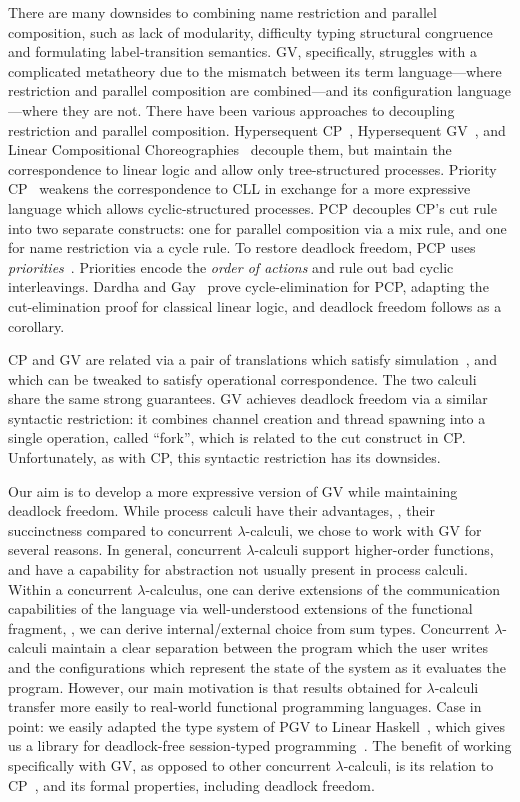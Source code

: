 There are many downsides to combining name restriction and parallel composition, such as lack of modularity, difficulty typing structural congruence and formulating label-transition semantics. GV, specifically, struggles with a complicated metatheory due to the mismatch between its term language---where restriction and parallel composition are combined---and its configuration language---where they are not. There have been various approaches to decoupling restriction and parallel composition. Hypersequent CP~\cite{MP18,kokkemontesi19popl,kokkemontesi19tlla}, Hypersequent GV~\cite{fowleretal21}, and Linear Compositional Choreographies~\cite{CarboneMS18} decouple them, but maintain the correspondence to linear logic and allow only tree-structured processes. Priority CP~\cite[PCP]{dardhagay18extended} weakens the correspondence to CLL in exchange for a more expressive language which allows cyclic-structured processes. PCP decouples CP's cut rule into two separate constructs: one for parallel composition via a mix rule, and one for name restriction via a cycle rule. To restore deadlock freedom, PCP uses \emph{priorities}~\cite{kobayashi06,padovani14}. Priorities encode the \emph{order of actions} and rule out bad cyclic interleavings. Dardha and Gay~\cite{dardhagay18extended} prove cycle-elimination for PCP, adapting the cut-elimination proof for classical linear logic, and deadlock freedom follows as a corollary.

CP and GV are related via a pair of translations which satisfy simulation~\cite{lindleymorris16}, and which can be tweaked to satisfy operational correspondence. The two calculi share the same strong guarantees. GV achieves deadlock freedom via a similar syntactic restriction: it combines channel creation and thread spawning into a single operation, called ``fork'', which is related to the cut construct in CP. Unfortunately, as with CP, this syntactic restriction has its downsides.

Our aim is to develop a more expressive version of GV while maintaining deadlock freedom. While process calculi have their advantages, \eg, their succinctness compared to concurrent $\lambda$-calculi, we chose to work with GV for several reasons. In general, concurrent $\lambda$-calculi support higher-order functions, and have a capability for abstraction not usually present in process calculi. Within a concurrent $\lambda$-calculus, one can derive extensions of the communication capabilities of the language via well-understood extensions of the functional fragment, \eg, we can derive internal/external choice from sum types. Concurrent $\lambda$-calculi maintain a clear separation between the program which the user writes and the configurations which represent the state of the system as it evaluates the program. However, our main motivation is that results obtained for $\lambda$-calculi transfer more easily to real-world functional programming languages. Case in point: we easily adapted the type system of PGV to Linear Haskell~\cite{bernardyboespflug18}, which gives us a library for deadlock-free session-typed programming~\cite{kokkedardha21hs}.
The benefit of working specifically with GV, as opposed to other concurrent $\lambda$-calculi, is its relation to CP~\cite{wadler14}, and its formal properties, including deadlock freedom.

